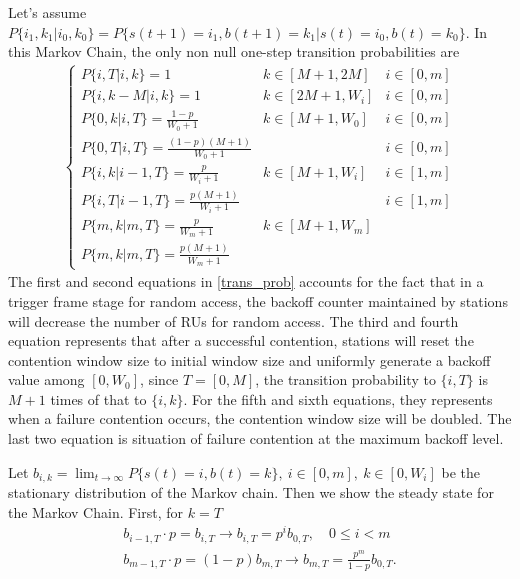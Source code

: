 \documentclass[journal]{IEEEtran}
\begin{document}
Let's assume $P\lbrace i_1, k_1|i_0,k_0\rbrace = P\lbrace s(t+1) = i_1, b(t+1)= k_1|s(t) = i_0, b(t) = k_0\rbrace $. In this Markov Chain, the only non null one-step transition probabilities are 
\begin{align}
\left\lbrace
\begin{array}{lll}
P\lbrace i, T | i, k \rbrace = 1  						& k\in [M+1,2M]			& i \in [0,m]\\ [3pt]
P\lbrace i, k-M | i, k \rbrace = 1  					& k\in [2M+1,W_i]   	& i \in [0,m]\\ [3pt]
P\lbrace 0, k | i, T \rbrace = \frac{1-p}{W_0+1}  		& k\in [M+1,W_0]		& i \in [0,m]\\ [3pt]
P\lbrace 0, T | i, T \rbrace = \frac{(1-p)(M+1)}{W_0+1} &						& i \in [0,m]\\ [3pt]
P\lbrace i, k | i-1, T \rbrace = \frac{p}{W_i+1} 		& k\in [M+1,W_i] 		& i \in [1,m]\\ [3pt]
P\lbrace i, T | i-1, T \rbrace = \frac{p(M+1)}{W_i+1}   &	  					& i \in [1,m]\\ [3pt]
P\lbrace m, k | m, T \rbrace = \frac{p}{W_m+1} 		 	& k\in [M+1,W_m] 		& \\ [3pt]
P\lbrace m, k | m, T \rbrace = \frac{p(M+1)}{W_m+1}
\end{array}
\right.
\label{trans_prob}
\end{align}
The first and second equations in \ref{trans_prob} accounts for the fact that in a trigger frame stage for random access, the backoff counter maintained by stations will decrease the number of RUs for random access. 
The third and fourth equation represents that after a successful contention, stations will reset the contention window size to initial window size and uniformly generate a backoff value among $[0,W_0]$, since $T = [0,M]$, the transition probability to $\lbrace i, T \rbrace$ is $M+1$ times of that to $\lbrace i, k \rbrace$. 
For the fifth and sixth equations, they represents when a failure contention occurs, the contention window size will be doubled. 
The last two equation is situation of failure contention at the maximum backoff level.

Let $b_{i,k} = \lim_{t\rightarrow \infty} P\lbrace s(t) = i, b(t) = k\rbrace,\ i\in [0,m], \ k \in [0,W_i]$ be the stationary distribution of the Markov chain. Then we show the steady state for the Markov Chain.
First,  for $k = T$
\begin{align}
b_{i-1,T}\cdot p = b_{i,T} 		\rightarrow b_{i,T} = p^i b_{0,T}, \quad 0\leq i < m\\
b_{m-1,T}\cdot p = (1-p) b_{m,T}	\rightarrow b_{m,T} = \frac{p^m}{1-p}b_{0,T}.
\label{biT}
\end{align}
\end{document}
